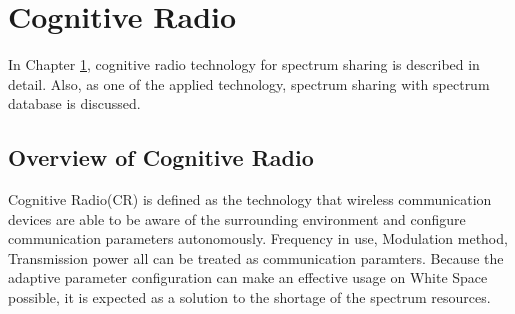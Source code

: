 \chapter[Cognitive Radio]{Cognitive Radio}
\label{chapter:CR}
In Chapter \ref{chapter:CR}, cognitive radio technology for spectrum sharing is described in detail. Also, as one of the applied technology, spectrum sharing with spectrum database is discussed.

\section{Overview of Cognitive Radio}
Cognitive Radio(CR) is defined as the technology that wireless communication devices are able to be aware of the surrounding environment and configure communication parameters autonomously. Frequency in use, Modulation method, Transmission power all can be treated as communication paramters. Because the adaptive parameter configuration can make an effective usage on White Space possible, it is expected as a solution to the shortage of the spectrum resources.

